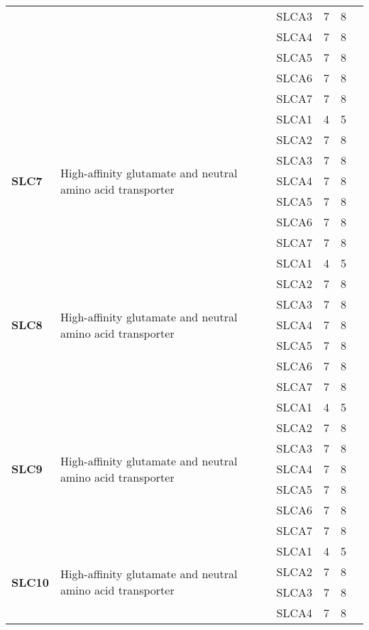 \documentclass[12pt]{report}
\begin{document}
\begin{center}
\begin{longtable}{|p{1.5cm}|p{3.2cm}|p{1.9cm}|p{1.65cm}|p{3cm}|p{3cm}|}
\cline{3-6}
&&SLCA3&7 & 8&\\ 
\cline{3-6}
&&SLCA4&7 & 8&\\ 
\cline{3-6}
&&SLCA5&7 & 8&\\ 
\cline{3-6}
&&SLCA6&7 & 8&\\ 
\cline{3-6}
&&SLCA7&7 & 8&\\ 
\hline
\multirow{7}{1.5cm}{\textbf{SLC7}} & \multirow{7}{4cm}{High-affinity glutamate and neutral amino acid transporter} & SLCA1 & 4 & 5&\\ 
\cline{3-6}
&&SLCA2&7 & 8&\\ 
\cline{3-6}
&&SLCA3&7 & 8&\\ 
\cline{3-6}
&&SLCA4&7 & 8&\\ 
\cline{3-6}
&&SLCA5&7 & 8&\\ 
\cline{3-6}
&&SLCA6&7 & 8&\\ 
\cline{3-6}
&&SLCA7&7 & 8&\\ 
\hline
\multirow{7}{1.5cm}{\textbf{SLC8}} & \multirow{7}{4cm}{High-affinity glutamate and neutral amino acid transporter} & SLCA1 & 4 & 5\\ 
\cline{3-6}
&&SLCA2&7 & 8&\\ 
\cline{3-6}
&&SLCA3&7 & 8&\\ 
\cline{3-6}
&&SLCA4&7 & 8&\\ 
\cline{3-6}
&&SLCA5&7 & 8&\\ 
\cline{3-6}
&&SLCA6&7 & 8&\\ 
\cline{3-6}
&&SLCA7&7 & 8&\\ 
\hline
\multirow{7}{1.5cm}{\textbf{SLC9}} & \multirow{7}{4cm}{High-affinity glutamate and neutral amino acid transporter} & SLCA1 & 4 & 5\\ 
\cline{3-6}
&&SLCA2&7 & 8&\\ 
\cline{3-6}
&&SLCA3&7 & 8&\\ 
\cline{3-6}
&&SLCA4&7 & 8&\\ 
\cline{3-6}
&&SLCA5&7 & 8&\\ 
\cline{3-6}
&&SLCA6&7 & 8&\\ 
\cline{3-6}
&&SLCA7&7 & 8&\\ 
\hline
\multirow{7}{1.5cm}{\textbf{SLC10}} & \multirow{7}{4cm}{High-affinity glutamate and neutral amino acid transporter} & SLCA1 & 4 & 5\\ 
\cline{3-6}
&&SLCA2&7 & 8&\\ 
\cline{3-6}
&&SLCA3&7 & 8&\\ 
\cline{3-6}
&&SLCA4&7 & 8&\\ 

\end{longtable}
\end{center}
\end{document}
